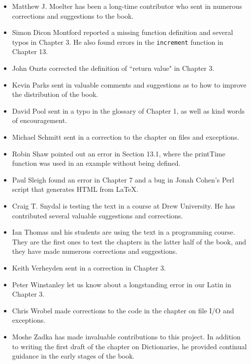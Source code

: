 \documentclass[10pt]{book}
\begin{document}
\begin{itemize}
\item Matthew J. Moelter has been a long-time contributor who sent
in numerous corrections and suggestions to the book.

\item Simon Dicon Montford reported a missing function definition and
several typos in Chapter 3.  He also found errors in the {\tt increment}
function in Chapter 13.

\item John Ouzts corrected the definition of ``return value"
in Chapter 3.

\item Kevin Parks sent in valuable comments and suggestions as to how
to improve the distribution of the book.

\item David Pool sent in a typo in the glossary of Chapter 1, as well
as kind words of encouragement.

\item Michael Schmitt sent in a correction to the chapter on files
and exceptions.

\item Robin Shaw pointed out an error in Section 13.1, where the
printTime function was used in an example without being defined.

\item Paul Sleigh found an error in Chapter 7 and a bug in Jonah Cohen's
Perl script that generates HTML from LaTeX.

\item Craig T. Snydal is testing the text in a course at Drew
University.  He has contributed several valuable suggestions and corrections.

\item Ian Thomas and his students are using the text in a programming
course.  They are the first ones to test the chapters in the latter half
of the book, and they have made numerous corrections and suggestions.

\item Keith Verheyden sent in a correction in Chapter 3.

\item Peter Winstanley let us know about a longstanding error in
our Latin in Chapter 3.

\item Chris Wrobel made corrections to the code in the chapter on
file I/O and exceptions.

\item Moshe Zadka has made invaluable contributions to this project.
In addition to writing the first draft of the chapter on Dictionaries, he
provided continual guidance in the early stages of the book.


\end{itemize}
\end{document}
